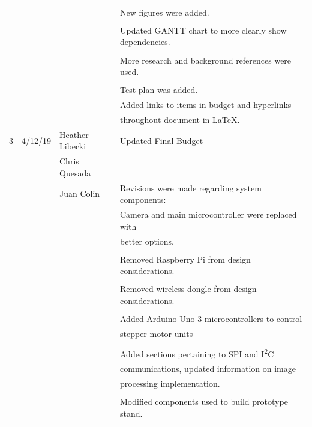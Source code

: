 \begin{table} [H]
\begin{tabular}{|l|l|l|l|}
	      &			 & 				   & New figures were added.\\
	      &			 &				   &	\\
	      &			 &				   & Updated GANTT chart to more clearly show dependencies.\\
	      &			 &				   &	\\
	      &			 &				   & More research and background references were used.\\
	      &			 &				   &	\\
	      &			 &				   & Test plan was added.\\
 	      &			 &				   & Added links to items in budget and hyperlinks \\
 	      &          		 &                 			   & throughout document in LaTeX.\\
 	     	 \hline
 	   3 & 4/12/19  	 & Heather Libecki & Updated Final Budget \\ 
 	      &          		 & Chris Quesada  	 	   & 	\\
 	      &			 & Juan Colin     		   & Revisions were made regarding system components: \\ 
 	      &			 &                 			   & Camera and main microcontroller were replaced with \\
 	      &			 &				   & better options. 	\\
 	      &          		 &               			   & 	\\
 	      &          		 &              			   & Removed Raspberry Pi from design considerations. \\
 	      &         		 &               			   & 	\\
 	      &         		 &             			   & Removed wireless dongle from design considerations. \\
 	      &        		 &              			   & \\
 	      &         		 &            		              & Added Arduino Uno 3 microcontrollers to control \\
 	      &        		 &                			   & stepper motor units \\
 	      &         		 &              			   & \\
 	      &         		 &               			   & Added sections pertaining to SPI and I\textsuperscript{2}C \\
 	      &         		 &              			   & communications, updated information on image \\
 	      &        		 &                 			   &  processing implementation. \\
 	      &         		 &               			   & \\
 	      &         		 &              			   & Modified components used to build prototype stand. \\
		\hline
\end{tabular} 
\end{table} 	      
